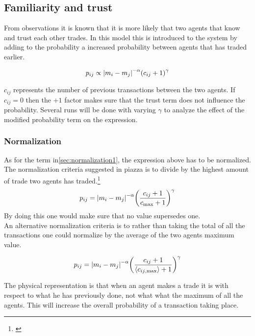 \subsection{Familiarity and trust}
\label{sec:familiarity and trust}
From observations it is known that it is more likely that two agents that know and trust each other trades. In this model this is introduced to the system by adding to the probability a increased probability between agents that has traded earlier.

\begin{align}
	p_{ij}\propto \abs{m_i-m_j}^{-\alpha}\qty(c_{ij}+1)^\gamma\label{eq:roughtrust}
\end{align}

$c_{ij}$ represents the number of previous transactions between the two agents. If $c_{ij}=0$ then the $+1$ factor makes sure that the trust term does not influence the probability. Several runs will be done with varying $\gamma$ to analyze the effect of the modified probability term on the expression.


\subsubsection{Normalization}
\label{sec:normalization2}

As for the term in\ref{sec:normalization1}, the expression above has to be normalized. The normalization criteria suggested in piazza is to divide by the highest amount of trade two agents has traded.\footnote{\href{https://piazza.com/class/j6owewp05ym46p?cid=126}{\color{blue}{Piazza: Morten's suggestion} }}
\begin{align}
p_{ij}= \abs{m_i-m_j}^{-\alpha}\qty(\frac{c_{ij}+1}{c_{\mathrm{max}}+1})^\gamma\label{eq:reformedtrust}
\end{align}
By doing this one would make sure that no value supersedes one.\\

An alternative normalization criteria is to rather than taking the total of all the transactions one could normalize by the average of the two agents maximum value.

\begin{align}
p_{ij}= \abs{m_i-m_j}^{-\alpha}\qty(\frac{c_{ij}+1}{\langle c_{ij \mathrm{, max}}  \rangle + 1})^\gamma\label{eq:BESTtrust}
\end{align}

The physical representation is that when an agent makes a trade it is with respect to what he has previously done, not what what the maximum of all the agents. This will increase the overall probability of a transaction taking place.

